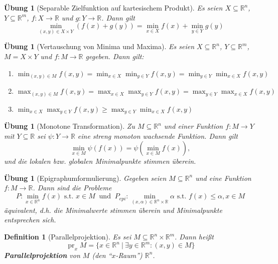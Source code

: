 \documentclass[11pt]{scrreprt}
\newcounter{thm}
\numberwithin{thm}{section}
\newtheorem{definition}[thm]{Definition}
\newtheorem{uebung}[thm]{Übung}
\newtheorem{uebung}[thm]{Übung}
\begin{document}
\begin{uebung}[Separable Zielfunktion auf kartesischem Produkt]
	Es seien $X \subseteq \mathbb{R}^n$, $Y \subseteq \mathbb{R}^m$, $f \colon X \rightarrow \mathbb{R}$ und $g \colon Y \rightarrow \mathbb{R}$. Dann gilt
	$$ \min_{(x,y) \in X \times Y} \left( f(x) + g(y) \right) = \min_{x \in X} f(x) + \min_{y \in Y} g(y) $$	
\end{uebung}

\begin{uebung}[Vertauschung von Minima und Maxima]
	Es seien $X \subseteq \mathbb{R}^n$, $Y \subseteq \mathbb{R}^m$, $M = X \times Y$ und $f \colon M \rightarrow \mathbb{R}$ gegeben. Dann gilt:
	\begin{enumerate}[label=\alph*\upshape)]
		\item $\min_{(x,y) \in M} f(x, y) = \min_{x \in X} \min_{y \in Y} f(x,y) = \min_{y \in Y} \min_{x \in X} f(x, y)$
		\item $\max_{(x,y) \in M} f(x, y) = \max_{x \in X} \max_{y \in Y} f(x,y) = \max_{y \in Y} \max_{x \in X} f(x, y)$
		\item $\min_{x \in X} \max_{y \in Y} f(x, y) \geq \max_{y \in Y} \min_{x \in X} f(x, y)$
	\end{enumerate}
\end{uebung}

\begin{uebung}[Monotone Transformation]
	Zu $M \subseteq \mathbb{R}^n$ und einer Funktion $f \colon M \rightarrow Y$ mit $Y\subseteq \mathbb{R}$ sei $\psi \colon Y \rightarrow \mathbb{R}$ eine streng monoton wachsende Funktion. Dann gilt
	$$ \min_{x \in M} \psi \left( f(x) \right) = \psi \left( \min_{x \in M} f(x) \right), $$
	und die lokalen bzw. globalen Minimalpunkte stimmen überein.
\end{uebung}

\begin{uebung}[Epigraphumformulierung]
	Gegeben seien $M \subseteq \mathbb{R}^n$ und eine Funktion $f \colon M \rightarrow \mathbb{R}$. Dann sind die Probleme
	$$ P \colon \min_{x \in \mathbb{R}^n} f(x) \text{ s.t. } x \in M ~\text{ und } ~ P_{epi} \colon \min_{(x, \alpha) \in \mathbb{R}^n \times \mathbb{R}} \alpha \text{ s.t. } f(x) \leq \alpha, x \in M $$
	äquivalent, d.h. die Minimalwerte stimmen überein und Minimalpunkte entsprechen sich.
\end{uebung}

\begin{definition}[Parallelprojektion]
	Es sei $M \subseteq \mathbb{R}^n \times \mathbb{R}^m$. Dann heißt
	$$ \operatorname{pr}_x M = \big\{ x \in \mathbb{R}^n ~|~\exists y \in \mathbb{R}^m : (x, y) \in M \big\} $$
	\textbf{Parallelprojektion} von $M$ (den \enquote{$x$-Raum}) $\mathbb{R}^n$.
\end{definition}
\end{document}
